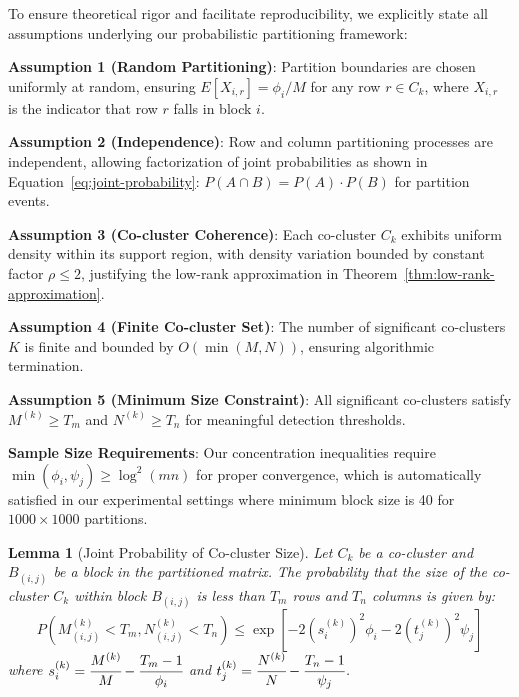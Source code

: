 \documentclass[journal]{IEEEtran}
\newtheorem{lemma}{Lemma}
\begin{document}
{\color{blue}


    To ensure theoretical rigor and facilitate reproducibility, we explicitly state all assumptions underlying our probabilistic partitioning framework:

    \textbf{Assumption 1 (Random Partitioning)}: Partition boundaries are chosen uniformly at random, ensuring $E[X_{i,r}] = \phi_i/M$ for any row $r \in C_k$, where $X_{i,r}$ is the indicator that row $r$ falls in block $i$.

    \textbf{Assumption 2 (Independence)}: Row and column partitioning processes are independent, allowing factorization of joint probabilities as shown in Equation~\eqref{eq:joint-probability}: $P(A \cap B) = P(A) \cdot P(B)$ for partition events.

    \textbf{Assumption 3 (Co-cluster Coherence)}: Each co-cluster $C_k$ exhibits uniform density within its support region, with density variation bounded by constant factor $\rho \leq 2$, justifying the low-rank approximation in Theorem~\ref{thm:low-rank-approximation}.

    \textbf{Assumption 4 (Finite Co-cluster Set)}: The number of significant co-clusters $K$ is finite and bounded by $O(\min(M,N))$, ensuring algorithmic termination.

    \textbf{Assumption 5 (Minimum Size Constraint)}: All significant co-clusters satisfy $M^{(k)} \geq T_m$ and $N^{(k)} \geq T_n$ for meaningful detection thresholds.

    \textbf{Sample Size Requirements}: Our concentration inequalities require $\min(\phi_i, \psi_j) \geq \log^2(mn)$ for proper convergence, which is automatically satisfied in our experimental settings where minimum block size is 40 for $1000 \times 1000$ partitions.
}

\begin{lemma}[Joint Probability of Co-cluster Size]
    \label{thm:joint-probability}
    Let $C_k$ be a co-cluster and $B_{(i,j)}$ be a block in the partitioned matrix. The probability that the size of the co-cluster $C_k$ within block $B_{(i,j)}$ is less than $T_m$ rows and $T_n$ columns is given by:
    \begin{equation}
        P(M_{(i,j)}^{(k)} < T_m, N_{(i,j)}^{(k)} < T_n) \leq \exp\left[-2 (s_i^{(k)})^2 \phi_i -2 (t_j^{(k)})^2 \psi_j\right]
        \label{eq:joint-probability}
    \end{equation}
    where $s_i^{(k)} = \cfrac{M^{(k)}}{M} - \cfrac{T_m-1}{\phi_i}$ and $t_j^{(k)} = \cfrac{N^{(k)}}{N} - \cfrac{T_n-1}{\psi_j}$.
\end{lemma}
\end{document}
